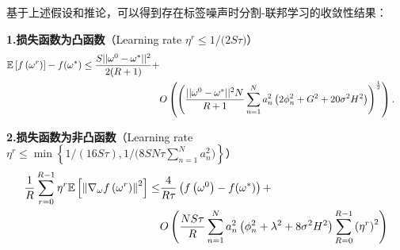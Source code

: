 
基于上述假设和推论，可以得到存在标签噪声时分割-联邦学习的收敛性结果：

\noindent \textbf{1.损失函数为凸函数}（Learning rate $\eta^r \leq 1/{(2 S\tau})$）
\begin{align}\label{bound-v2-gc-full4}
\mathbb{E}\left[f\left(\omega^{r}\right)\right]-f(\omega^*)\le \frac{S||\omega^0-\omega^*||^2}{2(R+1)}+ \\\notag
&O\left(\left(\frac{||\omega^0-\omega^*||^2 N}{R+1}\sum_{n=1}^Na_n^2\left(2\phi_n^2+G^2+20\sigma^2H^2\right)\right)^{\frac{1}{2}}\right).
\end{align}

\noindent \textbf{2.损失函数为非凸函数}（Learning rate $\eta^r \leq \min\left\{ {1}/{(16S\tau)}, {1}/{(8SN\tau\sum_{n=1}^Na_n^2})\right\}$）
\begin{align}\label{bound-v2-nc-full5}
\frac{1}{R}\sum_{r=0}^{R-1}\eta^r\mathbb{E}\left[\left\Vert\nabla_{\omega}f\left(\omega^{r}\right)\right\Vert^2\right]\leq& \frac{4}{R\tau}\left(f\left(\omega^{0}\right)-f(\omega^*)\right)+\\\notag
&O\left(\frac{NS\tau }{R} \sum_{n=1}^Na_n^2\left(\phi_n^2+\lambda^2+8\sigma^2H^2\right)\sum_{R=0}^{R-1}\left(\eta^r\right)^2\right)
\end{align}

